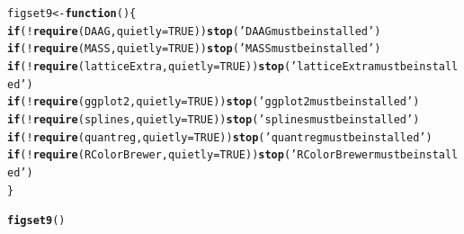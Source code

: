 \documentclass[12pt, a4paper,  BCOR=8.25mm, DIV=15]{scrartcl}\usepackage[]{graphicx}\usepackage[]{color}
\makeatletter
\newcommand{\hlnum}[1]{\textcolor[rgb]{0.686,0.059,0.569}{#1}}%
\newcommand{\hlstr}[1]{\textcolor[rgb]{0.192,0.494,0.8}{#1}}%
\newcommand{\hlopt}[1]{\textcolor[rgb]{0,0,0}{#1}}%
\newcommand{\hlstd}[1]{\textcolor[rgb]{0.345,0.345,0.345}{#1}}%
\newcommand{\hlkwa}[1]{\textcolor[rgb]{0.161,0.373,0.58}{\textbf{#1}}}%
\newcommand{\hlkwb}[1]{\textcolor[rgb]{0.69,0.353,0.396}{#1}}%
\newcommand{\hlkwc}[1]{\textcolor[rgb]{0.333,0.667,0.333}{#1}}%
\newcommand{\hlkwd}[1]{\textcolor[rgb]{0.737,0.353,0.396}{\textbf{#1}}}%
\newenvironment{kframe}{%
 \def\at@end@of@kframe{}%
 \ifinner\ifhmode%
  \def\at@end@of@kframe{\end{minipage}}%
  \begin{minipage}{\columnwidth}%
 \fi\fi%
 \def\FrameCommand##1{\hskip\@totalleftmargin \hskip-\fboxsep
 \colorbox{shadecolor}{##1}\hskip-\fboxsep
     \hskip-\linewidth \hskip-\@totalleftmargin \hskip\columnwidth}%
 \MakeFramed {\advance\hsize-\width
   \@totalleftmargin\z@ \linewidth\hsize
   \@setminipage}}%
 {\par\unskip\endMakeFramed%
 \at@end@of@kframe}
\newenvironment{knitrout}{}{} %
\makeatother
\begin{document}
\begin{knitrout}
\color{fgcolor}\begin{kframe}
\begin{alltt}
\hlstd{figset9} \hlkwb{<-} \hlkwa{function}\hlstd{()\{}
  \hlkwa{if}\hlstd{(}\hlopt{!}\hlkwd{require}\hlstd{(DAAG,} \hlkwc{quietly}\hlstd{=}\hlnum{TRUE}\hlstd{))}\hlkwd{stop}\hlstd{(}\hlstr{'DAAG must be installed'}\hlstd{)}
  \hlkwa{if}\hlstd{(}\hlopt{!}\hlkwd{require}\hlstd{(MASS,} \hlkwc{quietly}\hlstd{=}\hlnum{TRUE}\hlstd{))}\hlkwd{stop}\hlstd{(}\hlstr{'MASS must be installed'}\hlstd{)}
  \hlkwa{if}\hlstd{(}\hlopt{!}\hlkwd{require}\hlstd{(latticeExtra,} \hlkwc{quietly}\hlstd{=}\hlnum{TRUE}\hlstd{))}\hlkwd{stop}\hlstd{(}\hlstr{'latticeExtra must be installed'}\hlstd{)}
  \hlkwa{if}\hlstd{(}\hlopt{!}\hlkwd{require}\hlstd{(ggplot2,} \hlkwc{quietly}\hlstd{=}\hlnum{TRUE}\hlstd{))}\hlkwd{stop}\hlstd{(}\hlstr{'ggplot2 must be installed'}\hlstd{)}
  \hlkwa{if}\hlstd{(}\hlopt{!}\hlkwd{require}\hlstd{(splines,} \hlkwc{quietly}\hlstd{=}\hlnum{TRUE}\hlstd{))}\hlkwd{stop}\hlstd{(}\hlstr{'splines must be installed'}\hlstd{)}
  \hlkwa{if}\hlstd{(}\hlopt{!}\hlkwd{require}\hlstd{(quantreg,} \hlkwc{quietly}\hlstd{=}\hlnum{TRUE}\hlstd{))}\hlkwd{stop}\hlstd{(}\hlstr{'quantreg must be installed'}\hlstd{)}
  \hlkwa{if}\hlstd{(}\hlopt{!}\hlkwd{require}\hlstd{(RColorBrewer,} \hlkwc{quietly}\hlstd{=}\hlnum{TRUE}\hlstd{))}\hlkwd{stop}\hlstd{(}\hlstr{'RColorBrewer must be installed'}\hlstd{)}
  \hlstd{\}}
\end{alltt}
\end{kframe}
\end{knitrout}

\begin{knitrout}
\color{fgcolor}\begin{kframe}
\begin{alltt}
\hlkwd{figset9}\hlstd{()}
\end{alltt}


{\ttfamily\noindent\itshape\color{messagecolor}{\\Attaching package: 'MASS'

The following object is masked from 'package:DAAG':

\ \ \ \ hills


Attaching package: 'ggplot2'

The following object is masked from 'package:latticeExtra':

\ \ \ \ layer


Attaching package: 'SparseM'

The following object is masked from 'package:base':

\ \ \ \ backsolve}}\end{kframe}
\end{knitrout}
\end{document}
